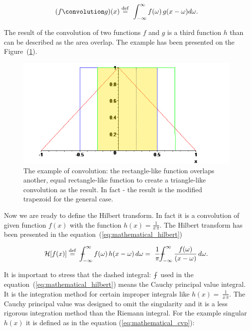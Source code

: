 \documentclass[12pt,twoside,a4paper]{article}
\numberwithin{equation}{subsection}
\numberwithin{figure}{subsection}
\def\Xint#1{\mathchoice
{\XXint\displaystyle\textstyle{#1}}%
{\XXint\textstyle\scriptstyle{#1}}%
{\XXint\scriptstyle\scriptscriptstyle{#1}}%
{\XXint\scriptscriptstyle\scriptscriptstyle{#1}}%
\!\int}
\def\XXint#1#2#3{{\setbox0=\hbox{$#1{#2#3}{\int}$ }\vcenter{\hbox{$#2#3$ }}\kern-.6\wd0}}
\def\dashint{\Xint-}
\begin{document}
\begin{equation} \label{eh:mth_convolution}
	(f \convolution g)(x) \stackrel{\mathrm{def}}{=}\  \int_{-\infty }^{\infty } f(\omega) \, g(x - \omega) d\omega .
\end{equation}
 
The result of the convolution of two functions $f$ and $g$ is a third function $h$ than can be described as the area overlap. The example
has been presented on the Figure~(\ref{fig:mathematical_convolution}).

\begin{figure} 
	\begin{center}
		\includegraphics{img/convolution.png}
		\caption{The example of convolution: the rectangle-like function overlaps another, equal rectangle-like function to create a
		triangle-like convolution as the result. In fact - the result is the modified trapezoid for the general case.
		\label{fig:mathematical_convolution}}
	\end{center}
\end{figure}  

Now we are ready to define the Hilbert transform. In fact it is a convolution of given function $f(x)$ with the function $h(x) =
\frac{1}{x \, \pi}$. The Hilbert transform has been presented in the equation~(\ref{eq:mathematical_hilbert})

\begin{equation} \label{eq:mathematical_hilbert}
	\mathcal{H}[f(x)] \stackrel{\mathrm{def}}{=}
	 \ \dashint_{ - \infty }^{\infty } f(\omega) \, h(x - \omega) \, d\omega 
	=\ \frac{1}{\pi} \dashint_{ - \infty }^{\infty } \frac{f(\omega)}{(x - \omega)} \, d\omega . 
\end{equation}

It is important to stress that the dashed integral: $\dashint$ used in the equation~(\ref{eq:mathematical_hilbert}) means the Cauchy
principal value integral. It is the integration method for certain improper integrals like $h(x) =\ \frac{1}{x \, \pi}$. The Cauchy
principal value was designed to omit the singularity and it is a less rigorous integration method than the Riemann integral. For the example
singular $ h(x) $ it is defined as in the equation (\ref{eq:mathematical_cvp}):
\end{document}
